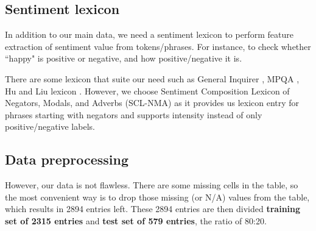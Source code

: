 \documentclass[12pt]{article}
\begin{document}
\subsection{Sentiment lexicon} \label{sentiment_lexicon}
In addition to our main data, we need a sentiment lexicon to perform feature extraction of sentiment value from tokens/phrases. For instance, to check whether ``happy" is positive or negative, and how positive/negative it is.

There are some lexicon that suite our need such as General Inquirer \cite{stone1966general}, MPQA \cite{wiebempqa}, Hu and Liu lexicon \cite{hu2004mining}. However, we choose Sentiment Composition Lexicon of Negators, Modals, and Adverbs (SCL-NMA) \cite{SCL-NMA} as it provides us lexicon entry for phrases starting with negators and supports intensity instead of only positive/negative labels.

\subsection{Data preprocessing}

However, our data is not flawless. There are some missing cells in the table, so the most convenient way is to drop those missing (or N/A) values from the table, which results in 2894 entries left. These 2894 entries are then divided \textbf{training set of 2315 entries} and \textbf{test set of 579 entries}, the ratio of 80:20.
\end{document}
